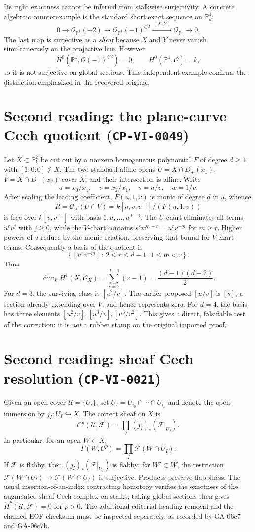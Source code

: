 \documentclass[11pt,a4paper]{article}
\newcommand{\cO}{\mathcal O}
\newcommand{\cF}{\mathcal F}
\newcommand{\cU}{\mathcal U}
\newcommand{\cC}{\mathcal C}
\newcommand{\GG}{\Gamma}
\newcommand{\CP}[1]{\texttt{CP-VI-#1}}
\begin{document}
Its right exactness cannot be inferred from stalkwise surjectivity. A concrete algebraic counterexample is the standard short exact sequence on \(\mathbb P^1_k\):
\[
0\longrightarrow\cO_{\mathbb P^1}(-2)
\longrightarrow\cO_{\mathbb P^1}(-1)^{\oplus2}
\xrightarrow{\,(X,Y)\,}\cO_{\mathbb P^1}\longrightarrow0.
\]
The last map is surjective as a \emph{sheaf} because \(X\) and \(Y\) never vanish simultaneously on the projective line. However
\[
H^0(\mathbb P^1,\cO(-1)^{\oplus2})=0,
\qquad H^0(\mathbb P^1,\cO)=k,
\]
so it is not surjective on global sections. This independent example confirms the distinction emphasized in the recovered original.

\section{Second reading: the plane-curve Cech quotient (\CP{0049})}
Let \(X\subset\mathbb P^2_k\) be cut out by a nonzero homogeneous polynomial \(F\) of degree \(d\ge1\), with \([1:0:0]\notin X\). The two standard affine opens
\(U=X\cap D_+(x_1)\), \(V=X\cap D_+(x_2)\)
cover \(X\), and their intersection is affine. Write
\[
u=x_0/x_1,\quad v=x_2/x_1,\quad s=u/v,\quad w=1/v.\]
After scaling the leading coefficient, \(F(u,1,v)\) is monic of degree \(d\) in \(u\), whence
\[
R=\cO_X(U\cap V)=k[u,v,v^{-1}]/(F(u,1,v))
\]
is free over \(k[v,v^{-1}]\) with basis \(1,u,\ldots,u^{d-1}\). The \(U\)-chart eliminates all terms \(u^rv^j\) with \(j\ge0\), while the \(V\)-chart contains \(s^r w^{m-r}=u^rv^{-m}\) for \(m\ge r\). Higher powers of \(u\) reduce by the monic relation, preserving that bound for \(V\)-chart terms. Consequently a basis of the quotient is
\[
\boxed{\left\{[u^rv^{-m}]\,:\,2\le r\le d-1,\ 1\le m<r\right\}}.
\]
Thus
\[
\dim_k H^1(X,\cO_X)=\sum_{r=2}^{d-1}(r-1)=\frac{(d-1)(d-2)}2.
\]
For \(d=3\), the surviving class is \([u^2/v]\). The earlier proposed \([u/v]\) is \([s]\), a section already extending over \(V\), and hence represents zero. For \(d=4\), the basis has three elements \([u^2/v], [u^3/v], [u^3/v^2]\). This gives a direct, falsifiable test of the correction: it is \emph{not} a rubber stamp on the original imported proof.

\section{Second reading: sheaf Cech resolution (\CP{0021})}
Given an open cover \(\cU=\{U_i\}\), set \(U_I=U_{i_0}\cap\cdots\cap U_{i_p}\) and denote the open immersion by \(j_I:U_I\hookrightarrow X\). The correct sheaf on \(X\) is
\[
\cC^p(\cU,\cF)=\prod_I (j_I)_*(\cF|_{U_I}).
\]
In particular, for an open \(W\subset X\),
\[
\GG(W,\cC^p)=\prod_I\cF(W\cap U_I).
\]
If \(\cF\) is flabby, then \((j_I)_*(\cF|_{U_I})\) is flabby: for \(W'\subset W\), the restriction
\(\cF(W\cap U_I)\to\cF(W'\cap U_I)\) is surjective. Products preserve flabbiness. The usual insertion-of-an-index contracting homotopy verifies the exactness of the augmented sheaf Cech complex on stalks; taking global sections then gives \(\check H^{p}(\cU,\cF)=0\) for \(p>0\). The additional editorial heading removal and the chained EOF checksum must be inspected separately, as recorded by GA-06c7 and GA-06c7b.
\end{document}
